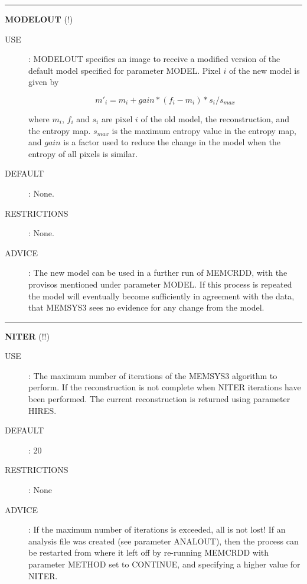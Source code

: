 \rule{\textwidth}{0.3mm}
{\Large {\bf MODELOUT } (!)}
\begin{description}
\item [USE]:
MODELOUT specifies an image to receive a modified version of the default model
specified for parameter MODEL. Pixel $i$ of the new model is given by

\begin {equation}
m'_{i}=m_{i}+gain*(f_{i}-m_{i})*s_{i}/s_{max}
\end {equation}

where $m_{i}$, $f_{i}$ and $s_{i}$ are pixel $i$ of the old model, the
reconstruction, and the entropy map. $s_{max}$ is the maximum entropy value in
the entropy map, and $gain$ is a factor used to reduce the change in
the model when the entropy of all pixels is similar.
\item [DEFAULT]:
None.
\item [RESTRICTIONS]:
None.
\item [ADVICE]:
The new model can be used in a further run of MEMCRDD, with the provisos
mentioned under parameter MODEL. If this process is repeated the model will
eventually become sufficiently in agreement with the data, that MEMSYS3 sees no
evidence for any change from the model.
\end {description}

\rule{\textwidth}{0.3mm}
{\Large {\bf NITER} (!!)}
\begin{description}
\item [USE]:
The maximum number of iterations of the MEMSYS3 algorithm to perform. If the
reconstruction is not complete when NITER iterations have been performed. The
current reconstruction is returned using parameter HIRES.
\item [DEFAULT]:
20
\item [RESTRICTIONS]:
None
\item [ADVICE]:
If the maximum number of iterations is exceeded, all is not lost! If an analysis
file was created (see parameter ANALOUT), then the process can be restarted from
where it left off by re-running MEMCRDD with parameter METHOD set to CONTINUE,
and specifying a higher value for NITER.
\end {description}


